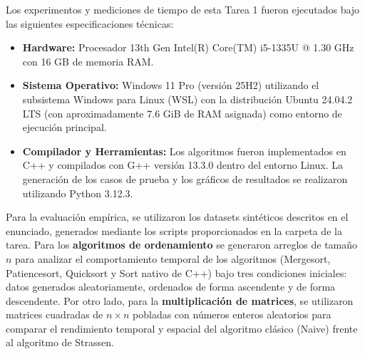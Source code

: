 Los experimentos y mediciones de tiempo de esta Tarea 1 fueron ejecutados bajo las siguientes especificaciones técnicas:

\begin{itemize}
    \item \textbf{Hardware:} Procesador 13th Gen Intel(R) Core(TM) i5-1335U @ 1.30 GHz con 16 GB de memoria RAM.
    
    \item \textbf{Sistema Operativo:} Windows 11 Pro (versión 25H2) utilizando el subsistema Windows para Linux (WSL) con la distribución Ubuntu 24.04.2 LTS (con aproximadamente 7.6 GiB de RAM asignada) como entorno de ejecución principal.
    
    \item \textbf{Compilador y Herramientas:} Los algoritmos fueron implementados en C++ y compilados con G++ versión 13.3.0 dentro del entorno Linux. La generación de los casos de prueba y los gráficos de resultados se realizaron utilizando Python 3.12.3.
\end{itemize}

Para la evaluación empírica, se utilizaron los datasets sintéticos descritos en el enunciado, generados mediante los scripts proporcionados en la carpeta de la tarea. Para los \textbf{algoritmos de ordenamiento} se generaron arreglos de tamaño $n$ para analizar el comportamiento temporal de los algoritmos (Mergesort, Patiencesort, Quicksort y Sort nativo de C++) bajo tres condiciones iniciales: datos generados aleatoriamente, ordenados de forma ascendente y de forma descendente. Por otro lado, para la \textbf{multiplicación de matrices}, se utilizaron matrices cuadradas de $n \times n$ pobladas con números enteros aleatorios para comparar el rendimiento temporal y espacial del algoritmo clásico (Naive) frente al algoritmo de Strassen.